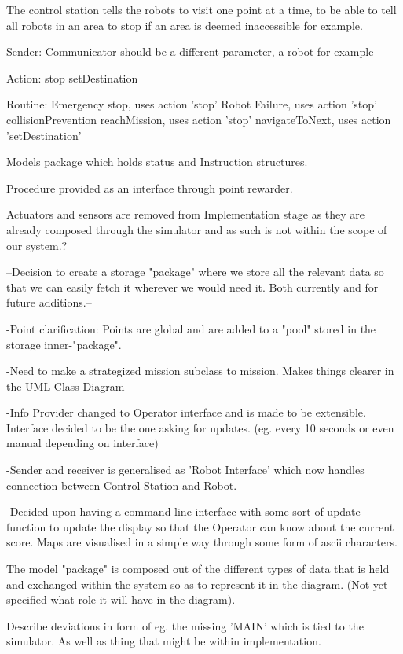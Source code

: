 The control station tells the robots to visit one point at a time, to be able to tell all robots in an area to stop if an area is deemed inaccessible for example.

Sender: Communicator should be a different parameter, a robot for example

Action:
stop
setDestination

Routine:
Emergency stop, uses action 'stop'
Robot Failure, uses action 'stop'
collisionPrevention
reachMission, uses action 'stop'
navigateToNext, uses action 'setDestination'

Models package which holds status and Instruction structures.

Procedure provided as an interface through point rewarder.

Actuators and sensors are removed from Implementation stage as they are already composed through the simulator and as such is not within the scope of our system.?

--Decision to create a storage "package" where we store all the relevant data so that we can easily fetch it wherever we would need it. Both currently and for future additions.--

-Point clarification:
  Points are global and are added to a "pool" stored in the storage inner-"package".
 
-Need to make a strategized mission subclass to mission. Makes things clearer in the UML Class Diagram

-Info Provider changed to Operator interface and is made to be extensible. Interface decided to be the one asking for updates. (eg. every 10 seconds or even manual depending on interface)

-Sender and receiver is generalised as 'Robot Interface' which now handles connection between Control Station and Robot.

-Decided upon having a command-line interface with some sort of update function to update the display so that the Operator can know about the current score. Maps are visualised in a simple way through some form of ascii characters.

The model "package" is composed out of the different types of data that is held and exchanged within the system so as to represent it in the diagram. (Not yet specified what role it will have in the diagram).

Describe deviations in form of eg. the missing 'MAIN' which is tied to the simulator. As well as thing that might be within implementation. 